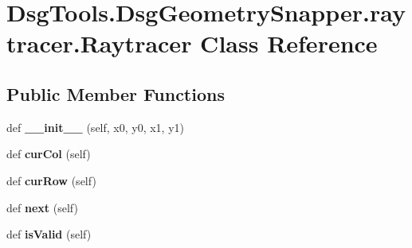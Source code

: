 \hypertarget{class_dsg_tools_1_1_dsg_geometry_snapper_1_1raytracer_1_1_raytracer}{}\section{Dsg\+Tools.\+Dsg\+Geometry\+Snapper.\+raytracer.\+Raytracer Class Reference}
\label{class_dsg_tools_1_1_dsg_geometry_snapper_1_1raytracer_1_1_raytracer}
\subsection*{Public Member Functions}
\begin{DoxyCompactItemize}
\item 
\mbox{\label{class_dsg_tools_1_1_dsg_geometry_snapper_1_1raytracer_1_1_raytracer_a6572ab573f860e9de52eadd9dcfae0b7}} 
def {\bfseries \+\_\+\+\_\+init\+\_\+\+\_\+} (self, x0, y0, x1, y1)
\item 
\mbox{\label{class_dsg_tools_1_1_dsg_geometry_snapper_1_1raytracer_1_1_raytracer_a1f92823165b6649d1727a1d1507762a4}} 
def {\bfseries cur\+Col} (self)
\item 
\mbox{\label{class_dsg_tools_1_1_dsg_geometry_snapper_1_1raytracer_1_1_raytracer_a2ed20988f42fed216065f81cfebbd5cb}} 
def {\bfseries cur\+Row} (self)
\item 
\mbox{\label{class_dsg_tools_1_1_dsg_geometry_snapper_1_1raytracer_1_1_raytracer_a5e387bffe36bf17970325160e952cf1f}} 
def {\bfseries next} (self)
\item 
\mbox{\label{class_dsg_tools_1_1_dsg_geometry_snapper_1_1raytracer_1_1_raytracer_a2502e399c3b9773b9cdd77e8472c676c}} 
def {\bfseries is\+Valid} (self)
\end{DoxyCompactItemize}
